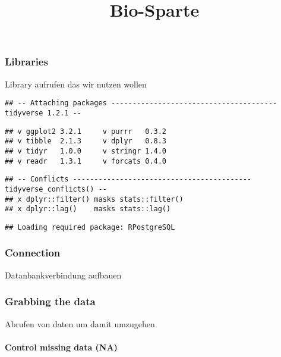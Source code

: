 \documentclass[]{article}
\title{Bio-Sparte}
\author{}
\date{}
\let\oldparagraph\paragraph
\renewcommand{\paragraph}[1]{\oldparagraph{#1}\mbox{}}
\begin{document}
\maketitle

\hypertarget{libraries}{%
\subsubsection{Libraries}\label{libraries}}

Library aufrufen das wir nutzen wollen

\begin{verbatim}
## -- Attaching packages --------------------------------------- tidyverse 1.2.1 --
\end{verbatim}

\begin{verbatim}
## v ggplot2 3.2.1     v purrr   0.3.2
## v tibble  2.1.3     v dplyr   0.8.3
## v tidyr   1.0.0     v stringr 1.4.0
## v readr   1.3.1     v forcats 0.4.0
\end{verbatim}

\begin{verbatim}
## -- Conflicts ------------------------------------------ tidyverse_conflicts() --
## x dplyr::filter() masks stats::filter()
## x dplyr::lag()    masks stats::lag()
\end{verbatim}

\begin{verbatim}
## Loading required package: RPostgreSQL
\end{verbatim}

\hypertarget{connection}{%
\subsubsection{Connection}\label{connection}}

Datanbankverbindung aufbauen

\hypertarget{grabbing-the-data}{%
\subsubsection{Grabbing the data}\label{grabbing-the-data}}

Abrufen von daten um damit umzugehen

\hypertarget{control-missing-data-na}{%
\paragraph{Control missing data (NA)}\label{control-missing-data-na}}
\end{document}
